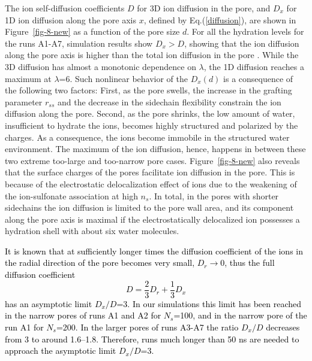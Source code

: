 \documentclass[3p,english,preprint]{elsarticle}
\newcommand{\need}[1]{\textcolor{black}{#1}}
\newcommand{\mage}[1]{\textcolor{black}{#1}}
\begin{document}
The ion self-diffusion coefficients  $D$  for  3D ion diffusion in the pore, and $D_x$  
for 1D ion diffusion along the pore axis $x$,
defined by Eq.(\ref{diffusion}),  are   shown in Figure~\ref{fig-8-new} 
as a function of the pore size $d$. 
For all the hydration levels for the runs A1-A7, simulation results 
show $D_x>D$, showing that  the ion diffusion along the pore axis is higher than the 
total ion diffusion in the pore  \cite{kerisit-2009}.
While the 3D diffusion has  almost a  monotonic  
 dependence on $\lambda$, the 1D diffusion reaches a maximum at $\lambda$=6. 
Such nonlinear behavior of the $D_x(d)$ is a consequence of 
the following two factors:  
First, as the pore swells, the increase in the grafting  parameter
$r_{ss}$ %
and the decrease in the sidechain flexibility constrain 
the ion diffusion along the pore. 
Second, as the pore shrinks,  the low amount of water, 
insufficient  to hydrate the ions, becomes  highly structured 
 and polarized by the charges. As a consequence, the ions %
become immobile in the structured water environment. 
  The maximum of the ion diffusion, hence,  happens in between  these
two extreme too-large and too-narrow
pore cases.  
Figure~\ref{fig-8-new} also reveals that the surface charges of the pores facilitate 
 ion diffusion in the pore. This is because of the electrostatic delocalization 
effect of ions due to the 
 weakening of the ion-sulfonate association at high $n_s$. 
In total,  in the  pores with shorter sidechains
 the  ion diffusion is limited to the pore wall area, and its 
component along the pore axis 
is maximal if the electrostatically  delocalized ion 
possesses  a hydration shell with about six water molecules. 


{\need{ 
It is known that at sufficiently longer times the diffusion coefficient of the ions in the radial 
direction of the pore becomes very small, $D_{r}$$\to$0, thus 
the full diffusion coefficient 
\begin{equation}
D = \frac{2}{3} D_r + \frac{1}{3} D_x
\label{asymptotic}
\end{equation}
has an asymptotic limit  $D_x/D$=3. In our simulations this limit has been reached 
in the narrow pores of runs A1 and A2 for $N_s$=100, and in the narrow pore of the run A1 for $N_s$=200.
In  the larger pores of runs A3-A7 the ratio $D_x/D$ decreases from 3 to around 1.6--1.8. Therefore, 
 runs much longer than 50 ns are needed to approach the asymptotic limit  $D_x/D$=3.    
}}
\end{document}

